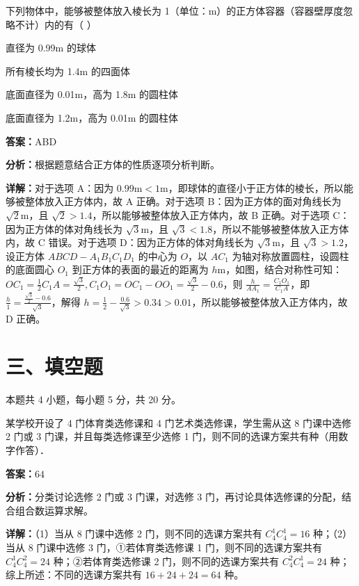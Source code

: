 \begin{question}[points=5]
下列物体中，能够被整体放入棱长为 1（单位：m）的正方体容器（容器壁厚度忽略不计）内的有（ ）
\begin{choices}
  \item 直径为 0.99m 的球体
  \item 所有棱长均为 1.4m 的四面体
  \item 底面直径为 0.01m，高为 1.8m 的圆柱体
  \item 底面直径为 1.2m，高为 0.01m 的圆柱体
\end{choices}
\begin{solution}
\textbf{答案：}ABD

\textbf{分析：}根据题意结合正方体的性质逐项分析判断。

\textbf{详解：}对于选项 A：因为 $0.99\text{m}<1\text{m}$，即球体的直径小于正方体的棱长，所以能够被整体放入正方体内，故 A 正确。对于选项 B：因为正方体的面对角线长为 $\sqrt{2}\text{m}$，且 $\sqrt{2}>1.4$，所以能够被整体放入正方体内，故 B 正确。对于选项 C：因为正方体的体对角线长为 $\sqrt{3}\text{m}$，且 $\sqrt{3}<1.8$，所以不能够被整体放入正方体内，故 C 错误。对于选项 D：因为正方体的体对角线长为 $\sqrt{3}\text{m}$，且 $\sqrt{3}>1.2$，设正方体 $ABCD-A_1B_1C_1D_1$ 的中心为 $O$，以 $AC_1$ 为轴对称放置圆柱，设圆柱的底面圆心 $O_1$ 到正方体的表面的最近的距离为 $h\text{m}$，如图，结合对称性可知：$OC_1=\frac{1}{2}C_1A=\frac{\sqrt{3}}{2}, C_1O_1=OC_1-OO_1=\frac{\sqrt{3}}{2}-0.6$，则 $\frac{h}{AA_1}=\frac{C_1O_1}{C_1A}$，即 $\frac{h}{1}=\frac{\frac{\sqrt{3}}{2}-0.6}{\sqrt{3}}$，解得 $h=\frac{1}{2}-\frac{0.6}{\sqrt{3}}>0.34>0.01$，所以能够被整体放入正方体内，故 D 正确。
\end{solution}
\end{question}

\section*{三、填空题}
本题共 4 小题，每小题 5 分，共 20 分。

\begin{question}[points=5]
某学校开设了 4 门体育类选修课和 4 门艺术类选修课，学生需从这 8 门课中选修 2 门或 3 门课，并且每类选修课至少选修 1 门，则不同的选课方案共有种（用数字作答）．
\fillin[{$64$}]
\begin{solution}
\textbf{答案：}$64$

\textbf{分析：}分类讨论选修 2 门或 3 门课，对选修 3 门，再讨论具体选修课的分配，结合组合数运算求解。

\textbf{详解：}（1）当从 8 门课中选修 2 门，则不同的选课方案共有 $C_4^1C_4^1=16$ 种；（2）当从 8 门课中选修 3 门，①若体育类选修课 1 门，则不同的选课方案共有 $C_4^1C_4^2=24$ 种；②若体育类选修课 2 门，则不同的选课方案共有 $C_4^2C_4^1=24$ 种；综上所述：不同的选课方案共有 $16+24+24=64$ 种。
\end{solution}
\end{question}

